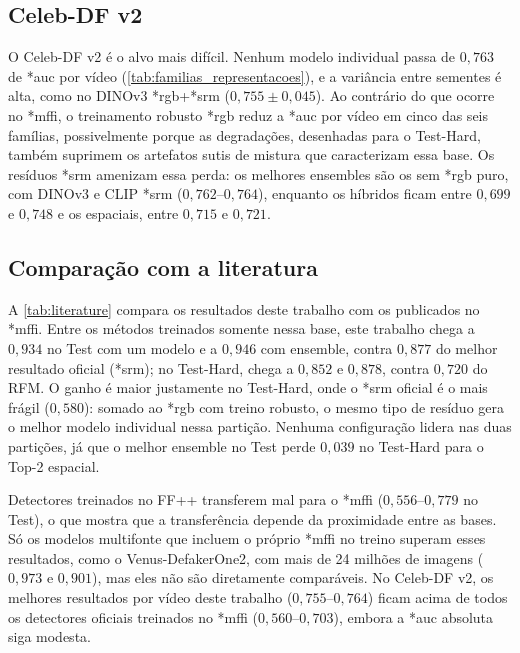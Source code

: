 \documentclass[10pt,conference]{IEEEtran}
\makeatletter
\newcommand{\acr@use}[2]{%
  \@ifundefined{acr@short@#1}{\textbf{??#1??}}{%
    \@ifundefined{acr@used@#1}{%
      \ifnum#2=0 \csname acr@long@#1\endcsname\else\csname acr@longpl@#1\endcsname\fi
      ~(\csname acr@short@#1\endcsname\ifnum#2=1 s\fi)%
      \expandafter\gdef\csname acr@used@#1\endcsname{}%
    }{%
      \csname acr@short@#1\endcsname\ifnum#2=1 s\fi
    }}%
}
\DeclareRobustCommand{\gls}{\@ifstar{\acr@use@s}{\acr@use@s}}
\newcommand{\acr@use@s}[1]{\acr@use{#1}{0}}
\makeatother
\begin{document}
\subsection{Celeb-DF v2}
\label{sec:celeb}

O Celeb-DF v2 é o alvo mais difícil.
Nenhum modelo individual passa de $0{,}763$ de \gls*{auc} por vídeo (\cref{tab:familias_representacoes}), e a variância entre sementes é alta, como no DINOv3 \gls*{rgb}+\gls*{srm} ($0{,}755\pm0{,}045$).
Ao contrário do que ocorre no \gls*{mffi}, o treinamento robusto \gls*{rgb} reduz a \gls*{auc} por vídeo em cinco das seis famílias, possivelmente porque as degradações, desenhadas para o Test-Hard, também suprimem os artefatos sutis de mistura que caracterizam essa base.
Os resíduos \gls*{srm} amenizam essa perda: os melhores ensembles são os sem \gls*{rgb} puro, com DINOv3 e CLIP \gls*{srm} ($0{,}762$--$0{,}764$), enquanto os híbridos ficam entre $0{,}699$ e $0{,}748$ e os espaciais, entre $0{,}715$ e $0{,}721$.

\subsection{Comparação com a literatura}
\label{sec:literature}

A \cref{tab:literature} compara os resultados deste trabalho com os publicados no \gls*{mffi}.
Entre os métodos treinados somente nessa base, este trabalho chega a $0{,}934$ no Test com um modelo e a $0{,}946$ com ensemble, contra $0{,}877$ do melhor resultado oficial (\gls*{srm}); no Test-Hard, chega a $0{,}852$ e $0{,}878$, contra $0{,}720$ do RFM.
O ganho é maior justamente no Test-Hard, onde o \gls*{srm} oficial é o mais frágil ($0{,}580$): somado ao \gls*{rgb} com treino robusto, o mesmo tipo de resíduo gera o melhor modelo individual nessa partição.
Nenhuma configuração lidera nas duas partições, já que o melhor ensemble no Test perde $0{,}039$ no Test-Hard para o Top-2 espacial.

Detectores treinados no FF++ transferem mal para o \gls*{mffi} ($0{,}556$--$0{,}779$ no Test), o que mostra que a transferência depende da proximidade entre as bases.
Só os modelos multifonte que incluem o próprio \gls*{mffi} no treino superam esses resultados, como o Venus-DefakerOne2, com mais de 24 milhões de imagens ($0{,}973$ e $0{,}901$), mas eles não são diretamente comparáveis.
No Celeb-DF v2, os melhores resultados por vídeo deste trabalho ($0{,}755$--$0{,}764$) ficam acima de todos os detectores oficiais treinados no \gls*{mffi} ($0{,}560$--$0{,}703$), embora a \gls*{auc} absoluta siga modesta.
\end{document}
